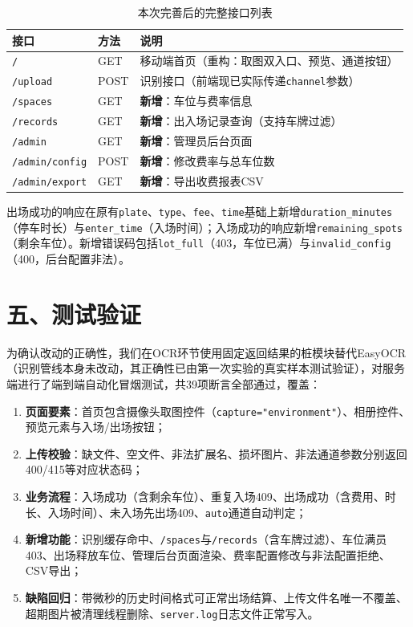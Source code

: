 \documentclass[12pt,a4paper]{article}
\begin{document}
\begin{table}[H]
  \centering
  \begin{tabular}{lll}
    \toprule
    接口 & 方法 & 说明 \\
    \midrule
    \texttt{/} & GET & 移动端首页（重构：取图双入口、预览、通道按钮） \\
    \texttt{/upload} & POST & 识别接口（前端现已实际传递\texttt{channel}参数） \\
    \texttt{/spaces} & GET & \textbf{新增}：车位与费率信息 \\
    \texttt{/records} & GET & \textbf{新增}：出入场记录查询（支持车牌过滤） \\
    \texttt{/admin} & GET & \textbf{新增}：管理员后台页面 \\
    \texttt{/admin/config} & POST & \textbf{新增}：修改费率与总车位数 \\
    \texttt{/admin/export} & GET & \textbf{新增}：导出收费报表CSV \\
    \bottomrule
  \end{tabular}
  \caption{本次完善后的完整接口列表}
\end{table}

出场成功的响应在原有\texttt{plate}、\texttt{type}、\texttt{fee}、\texttt{time}基础上新增\texttt{duration\_minutes}（停车时长）与\texttt{enter\_time}（入场时间）；入场成功的响应新增\texttt{remaining\_spots}（剩余车位）。新增错误码包括\texttt{lot\_full}（403，车位已满）与\texttt{invalid\_config}（400，后台配置非法）。

\section*{五、测试验证}
为确认改动的正确性，我们在OCR环节使用固定返回结果的桩模块替代EasyOCR（识别管线本身未改动，其正确性已由第一次实验的真实样本测试验证），对服务端进行了端到端自动化冒烟测试，共39项断言全部通过，覆盖：

\begin{enumerate}
  \item \textbf{页面要素}：首页包含摄像头取图控件（\texttt{capture="environment"}）、相册控件、预览元素与入场/出场按钮；
  \item \textbf{上传校验}：缺文件、空文件、非法扩展名、损坏图片、非法通道参数分别返回400/415等对应状态码；
  \item \textbf{业务流程}：入场成功（含剩余车位）、重复入场409、出场成功（含费用、时长、入场时间）、未入场先出场409、\texttt{auto}通道自动判定；
  \item \textbf{新增功能}：识别缓存命中、\texttt{/spaces}与\texttt{/records}（含车牌过滤）、车位满员403、出场释放车位、管理后台页面渲染、费率配置修改与非法配置拒绝、CSV导出；
  \item \textbf{缺陷回归}：带微秒的历史时间格式可正常出场结算、上传文件名唯一不覆盖、超期图片被清理线程删除、\texttt{server.log}日志文件正常写入。
\end{enumerate}
\end{document}
